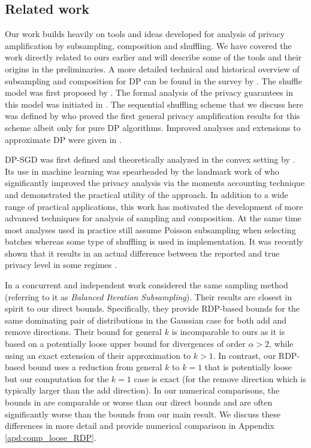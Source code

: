 \documentclass{article}
\theoremstyle{plain}
\theoremstyle{definition}
\begin{document}
\subsection{Related work}
Our work builds heavily on tools and ideas developed for analysis of privacy amplification by subsampling, composition and shuffling. We have covered the work directly related to ours earlier and will describe some of the tools and their origins in the preliminaries. A more detailed technical and historical overview of subsampling and composition for DP can be found in the survey by \citet{Steinke22}.  The shuffle model was first proposed by \citet{BEMMRLRKTS17}. The formal analysis of the privacy guarantees in this model was initiated in \citep{EFMRTT19, CSUZZ19}. The sequential shuffling scheme that we discuss here was defined by \citet{EFMRTT19} who proved the first general privacy amplification results for this scheme albeit only for pure DP algorithms. Improved analyses and extensions to approximate DP were given in \citep{BBGN19, BKMT20, FMT21, FMT23, GDDKS21, KHH22}.

DP-SGD was first defined and theoretically analyzed in the convex setting by \citet{BST14}. Its use in machine learning was spearheaded by the landmark work of 
\citet{ACGMMT16} who significantly improved the privacy analysis via the moments accounting technique and demonstrated the practical utility of the approach. In addition to a wide range of practical applications, this work  has motivated the development of more advanced techniques for analysis of sampling and composition. At the same time most analyses used in practice still assume Poisson subsampling when selecting batches whereas some type of shuffling is used in implementation. It was recently shown that it results in an actual difference between the reported and true privacy level in some regimes \citep{CGKKMSZ24a, CGKKMSZ24b, ABDCH24}.

In a concurrent and independent work \citet{DCO25} considered the same sampling method (referring to it as \emph{Balanced Iteration Subsampling}). Their results are closest in spirit to our direct bounds. Specifically, they provide RDP-based bounds for the same dominating pair of distributions in the Gaussian case for both add and remove directions. Their bound for general $k$ is incomparable to ours as it is based on a potentially loose upper bound for divergences of order $\alpha > 2$, while using an exact extension of their approximation to $k > 1$. In contrast, our RDP-based bound uses a reduction from general $k$ to $k=1$ that is potentially loose but our computation for the $k=1$ case is exact (for the remove direction which is typically larger than the add direction). In our numerical comparisons, the bounds in \cite{DCO25} are comparable or worse than our direct bounds and are often significantly worse than the bounds from our main result. We discuss these differences in more detail and provide numerical comparison in Appendix \ref{apd:comp_loose_RDP}.
\end{document}

